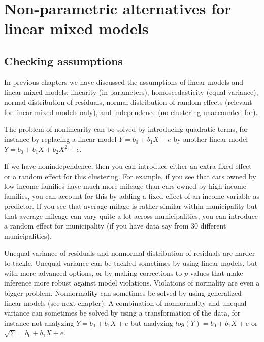 \documentclass[]{report}\usepackage[]{graphicx}\usepackage[]{color}
\begin{document}

\chapter{Non-parametric alternatives for linear mixed models}


\section{Checking assumptions}

In previous chapters we have discussed the assumptions of linear models and linear mixed models: linearity (in parameters), homoscedasticity (equal variance), normal distribution of residuals, normal distribution of random effects (relevant for linear mixed models only), and independence (no clustering unaccounted for). 




The problem of nonlinearity can be solved by introducing quadratic terms, for instance by replacing a linear model $Y = b_0 + b_1 X + e$ by another linear model $Y = b_0 + b_1 X + b_2 X^2 + e$.

If we have nonindependence, then you can introduce either an extra fixed effect or a random effect for this clustering. For example, if you see that cars owned by low income families have much more mileage than cars owned by high income families, you can account for this by adding a fixed effect of an income variable as predictor. If you see that average milage is rather similar within municipality but that average mileage can vary quite a lot across municipalities, you can introduce a random effect for municipality (if you have data say from 30 different municipalities). 

Unequal variance of residuals and nonnormal distribution of residuals are harder to tackle. Unequal variance can be tackled sometimes by using linear models, but with more advanced options, or by making corrections to $p$-values that make inference more robust against model violations. Violations of normality are even a bigger problem. Nonnormality can sometimes be solved by using generalized linear models (see next chapter). A combination of nonnormality and unequal variance can sometimes be solved by using a transformation of the data, for instance not analyzing $Y = b_0 + b_1 X + e$ but analyzing $log(Y)=  b_0 + b_1 X + e$ or $\sqrt{Y}=  b_0 + b_1 X + e$.
\end{document}

